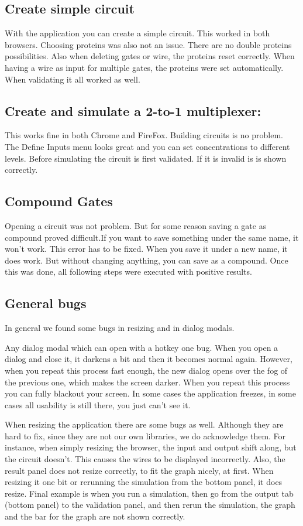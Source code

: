 \documentclass{article}
\newcounter{step}
\begin{document}
\subsection{Create simple circuit}
With the application you can create a simple circuit. This worked in both browsers. Choosing proteins was also not an issue. There are no double proteins possibilities. Also when deleting gates or wire, the proteins reset correctly. When having a wire as input for multiple gates, the proteins were set automatically. 
When validating it all worked as well.

\subsection{Create and simulate a 2-to-1 multiplexer:}
This works fine in both Chrome and FireFox. Building circuits is no problem. The Define Inputs menu looks great and you can set concentrations to different levels. Before simulating the circuit is first validated. If it is invalid is is shown correctly.

\subsection{Compound Gates}
Opening a circuit was not problem. But for some reason saving a gate as compound proved difficult.If you want to save something under the same name, it won't work. This error has to be fixed. When you save it under a new name, it does work.
But without changing anything, you can save as a compound. Once this was done, all following steps were executed with positive results.

\subsection{General bugs}
In general we found some bugs in resizing and in dialog modals.

Any dialog modal which can open with a hotkey one bug. When you open a dialog and close it, it darkens a bit and then it becomes normal again. However, when you repeat this process fast enough, the new dialog opens over the fog of the previous one, which makes the screen darker. When you repeat this process you can fully blackout your screen. In some cases the application freezes, in some cases all usability is still there, you just can't see it.

When resizing the application there are some bugs as well. Although they are hard to fix, since they are not our own libraries, we do acknowledge them.
For instance, when simply resizing the browser, the input and output shift along, but the circuit doesn't. This causes the wires to be displayed incorrectly. Also, the result panel does not resize correctly, to fit the graph nicely, at first. When resizing it one bit or rerunning the simulation from the bottom panel, it does resize.
Final example is when you run a simulation, then go from the output tab (bottom panel) to the validation panel, and then rerun the simulation, the graph and the bar for the graph are not shown correctly.
\end{document}
